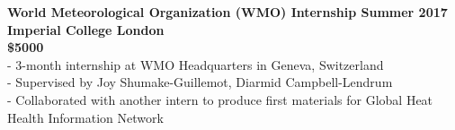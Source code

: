 \noindent \textbf{World Meteorological Organization (WMO) Internship \hfill Summer 2017 \\ 
Imperial College London \\
\$5000 }\\
- 3-month internship at WMO Headquarters in Geneva, Switzerland \\
- Supervised by Joy Shumake-Guillemot, Diarmid Campbell-Lendrum \\
- Collaborated with another intern to produce first materials for Global Heat Health Information Network \medskip



